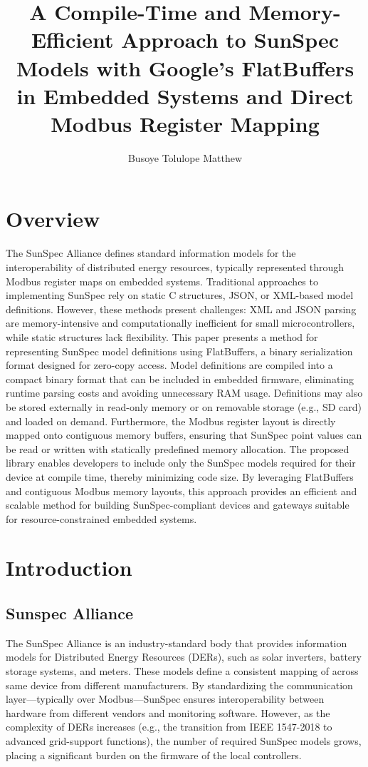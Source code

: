 \documentclass{article}
\title{A Compile-Time and Memory-Efficient Approach to SunSpec Models with Google's  FlatBuffers in Embedded Systems and Direct Modbus Register Mapping}
\author{Busoye Tolulope Matthew}
\begin{document}
\maketitle

\section{Overview}
\label{sec:overview}
The SunSpec Alliance defines standard information models for the interoperability of distributed energy resources, typically represented through Modbus register maps on embedded systems. Traditional approaches to implementing SunSpec rely on static C structures, JSON, or XML-based model definitions. However, these methods present challenges: XML and JSON parsing are memory-intensive and computationally inefficient for small microcontrollers, while static structures lack flexibility.
This paper presents a method for representing SunSpec model definitions using FlatBuffers, a binary serialization format designed for zero-copy access. Model definitions are compiled into a compact binary format that can be included in embedded firmware, eliminating runtime parsing costs and avoiding unnecessary RAM usage. Definitions may also be stored externally in read-only memory or on removable storage (e.g., SD card) and loaded on demand. Furthermore, the Modbus register layout is directly mapped onto contiguous memory buffers, ensuring that SunSpec point values can be read or written with statically predefined memory allocation.
The proposed library enables developers to include only the SunSpec models required for their device at compile time, thereby minimizing code size. By leveraging FlatBuffers and contiguous Modbus memory layouts, this approach provides an efficient and scalable method for building SunSpec-compliant devices and gateways suitable for resource-constrained embedded systems.

\section{Introduction}
\label{sec:introduction}

\subsection{Sunspec Alliance}
The SunSpec Alliance is an industry-standard body that provides information models for Distributed Energy Resources (DERs), such as solar inverters, battery storage systems, and meters. These models define a consistent mapping of across same device from different manufacturers. By standardizing the communication layer—typically over Modbus—SunSpec ensures interoperability between hardware from different vendors and monitoring software. However, as the complexity of DERs increases (e.g., the transition from IEEE 1547-2018 to advanced grid-support functions), the number of required SunSpec models grows, placing a significant burden on the firmware of the local controllers. 
\end{document}

